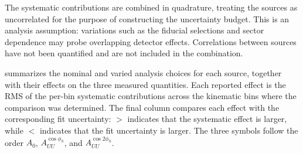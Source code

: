 The systematic contributions are combined in quadrature, treating the sources as uncorrelated for the purpose of constructing the uncertainty budget. This is an analysis assumption: variations such as the fiducial selections and sector dependence may probe overlapping detector effects. Correlations between sources have not been quantified and are not included in the combination.


 summarizes the nominal and varied analysis choices for each source, together with their effects on the three measured quantities. Each reported effect is the RMS of the per-bin systematic contributions across the kinematic bins where the comparison was determined. The final column compares each effect with the corresponding fit uncertainty: $>$ indicates that the systematic effect is larger, while $<$ indicates that the fit uncertainty is larger. The three symbols follow the order $A_{0}$, $A_{UU}^{\cos\phi_h}$, and $A_{UU}^{\cos 2\phi_h}$.


